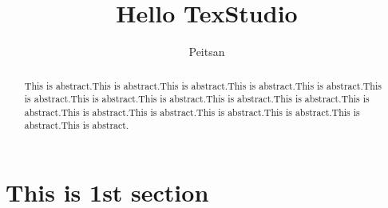 \documentclass[]{article}
\title{Hello TexStudio}
\author{Peitsan}
\begin{document}
\maketitle
\begin{abstract}
	This is abstract.This is abstract.This is abstract.This is abstract.This is abstract.This is abstract.This is abstract.This is abstract.This is abstract.This is abstract.This is abstract.This is abstract.This is abstract.This is abstract.This is abstract.This is abstract.This is abstract.
\end{abstract}
\section{This is 1st section}
\end{document}
